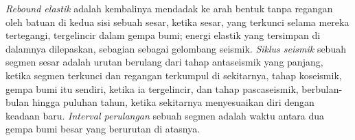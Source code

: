 \begin{definition}\label{def:b1:earthquake-source:seismic-cycle}
\emph{Rebound elastik} adalah kembalinya mendadak ke arah bentuk tanpa regangan oleh batuan di kedua sisi sebuah sesar, ketika sesar, yang terkunci selama mereka tertegangi, tergelincir dalam gempa bumi; energi elastik yang tersimpan di dalamnya dilepaskan, sebagian sebagai gelombang seismik. \emph{Siklus seismik} sebuah segmen sesar adalah urutan berulang dari tahap antaseismik yang panjang, ketika segmen terkunci dan regangan terkumpul di sekitarnya, tahap koseismik, gempa bumi itu sendiri, ketika ia tergelincir, dan tahap pascaseismik, berbulan-bulan hingga puluhan tahun, ketika sekitarnya menyesuaikan diri dengan keadaan baru. \emph{Interval perulangan} sebuah segmen adalah waktu antara dua gempa bumi besar yang berurutan di atasnya.
\end{definition}


